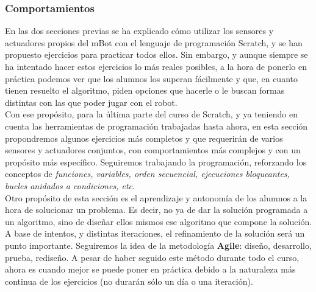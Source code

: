 \subsubsection{Comportamientos}\label{subsubsec:comportamientos}
En las dos secciones previas se ha explicado cómo utilizar los sensores y actuadores propios del mBot con el lenguaje de programación Scratch, y se han propuesto ejercicios para practicar todos ellos. Sin embargo, y aunque siempre se ha intentado hacer estos ejercicios lo más reales posibles, a la hora de ponerlo en práctica podemos ver que los alumnos los superan fácilmente y que, en cuanto tienen resuelto el algoritmo, piden opciones que hacerle o le buscan formas distintas con las que poder jugar con el robot. \\
Con ese propósito, para la última parte del curso de Scratch, y ya teniendo en cuenta las herramientas de programación trabajadas hasta ahora, en esta sección propondremos algunos ejercicios más completos y que requerirán de varios sensores y actuadores conjuntos, con comportamientos más complejos y con un propósito más específico. Seguiremos trabajando la programación, reforzando los conceptos de \textit{funciones, variables, orden secuencial, ejecuciones bloqueantes, bucles anidados a condiciones, etc}. \\
Otro propósito de esta sección es el aprendizaje y autonomía de los alumnos a la hora de solucionar un problema. Es decir, no ya de dar la solución programada a un algoritmo, sino de diseñar ellos mismos ese algoritmo que compone la solución. A base de intentos, y distintas iteraciones, el refinamiento de la solución será un punto importante. Seguiremos la idea de la metodología \textbf{Agile}: diseño, desarrollo, prueba, rediseño. A pesar de haber seguido este método durante todo el curso, ahora es cuando mejor se puede poner en práctica debido a la naturaleza más continua de los ejercicios (no durarán sólo un día o una iteración).

